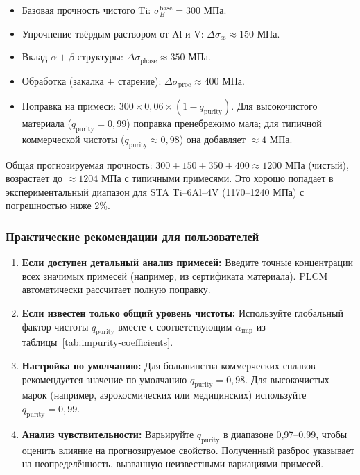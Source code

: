 \documentclass[12pt,a4paper]{article}
\begin{document}
	\begin{itemize}
		\item Базовая прочность чистого Ti: \(\sigma_B^{\mathrm{base}} = 300\) МПа.
		\item Упрочнение твёрдым раствором от Al и V: \(\Delta\sigma_{\mathrm{ss}} \approx 150\) МПа.
		\item Вклад \(\alpha+\beta\) структуры: \(\Delta\sigma_{\mathrm{phase}} \approx 350\) МПа.
		\item Обработка (закалка + старение): \(\Delta\sigma_{\mathrm{proc}} \approx 400\) МПа.
		\item Поправка на примеси: \(300 \times 0,06 \times (1 - q_{\mathrm{purity}})\). Для высокочистого материала (\(q_{\mathrm{purity}}=0,99\)) поправка пренебрежимо мала; для типичной коммерческой чистоты (\(q_{\mathrm{purity}}\approx 0,98\)) она добавляет \(\approx 4\) МПа.
	\end{itemize}
	
	Общая прогнозируемая прочность: \(300+150+350+400 \approx 1200\) МПа (чистый), возрастает до \(\approx 1204\) МПа с типичными примесями. Это хорошо попадает в экспериментальный диапазон для STA Ti--6Al--4V (1170–1240 МПа) с погрешностью ниже 2\%.
	
	\subsubsection*{Практические рекомендации для пользователей}
	
	\begin{enumerate}
		\item \textbf{Если доступен детальный анализ примесей:} Введите точные концентрации всех значимых примесей (например, из сертификата материала). PLCM автоматически рассчитает полную поправку.
		\item \textbf{Если известен только общий уровень чистоты:} Используйте глобальный фактор чистоты \(q_{\mathrm{purity}}\) вместе с соответствующим \(\alpha_{\mathrm{imp}}\) из таблицы~\ref{tab:impurity-coefficients}.
		\item \textbf{Настройка по умолчанию:} Для большинства коммерческих сплавов рекомендуется значение по умолчанию \(q_{\mathrm{purity}} = 0,98\). Для высокочистых марок (например, аэрокосмических или медицинских) используйте \(q_{\mathrm{purity}} = 0,99\).
		\item \textbf{Анализ чувствительности:} Варьируйте \(q_{\mathrm{purity}}\) в диапазоне 0,97–0,99, чтобы оценить влияние на прогнозируемое свойство. Полученный разброс указывает на неопределённость, вызванную неизвестными вариациями примесей.
	\end{enumerate}
	
\end{document}
